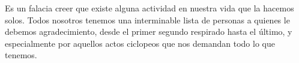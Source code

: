 \documentclass[11pt,twoside,openright]{moddalthesis}
\theoremstyle{definition}
\begin{document}
\begin{acknowledgements}
Es un falacia creer que existe alguna actividad en nuestra vida que la hacemos solos.  Todos nosotros tenemos una interminable lista de personas a quienes le debemos agradecimiento, desde el primer segundo respirado hasta el último, y especialmente por aquellos actos ciclopeos que nos demandan todo lo que tenemos.
\end{acknowledgements}





\listoftables
{}

\listoffigures
{}


\afterpreface
\linespread{1.5}


\end{document}
